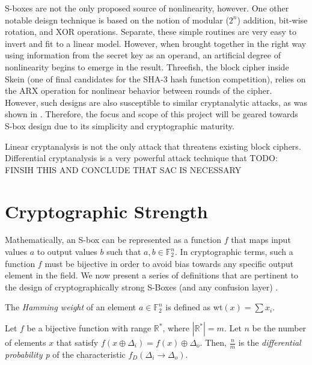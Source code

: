 \documentclass[11pt]{article}
\newcommand{\field}[1]{\mathbb{#1}} %
\begin{document}
S-boxes are not the only proposed source of nonlinearity, however. One other notable deisgn technique is based on the notion of modular ($2^n$) addition, bit-wise rotation, and XOR operations. Separate, these simple routines are very easy to invert and fit to a linear model. However, when brought together in the right way using information from the secret key as an operand, an artificial degree of nonlinearity begins to emerge in the result. Threefish, the block cipher inside Skein (one of final candidates for the SHA-3 hash function competition), relies on the ARX operation for nonlinear behavior between rounds of the cipher. However, such designs are also susceptible to similar cryptanalytic attacks, as was shown in \cite{Khovratovich:2010:RCA:1876089.1876116}. Therefore, the focus and scope of this project will be geared towards S-box design due to its simplicity and cryptographic maturity.

Linear cryptanalysis is not the only attack that threatens existing block ciphers. Differential cryptanalysis is a very powerful attack technique that TODO: FINSIH THIS AND CONCLUDE THAT SAC IS NECESSARY

\section{Cryptographic Strength}
Mathematically, an S-box can be represented as a function $f$ that maps input values $a$ to output values $b$ such that $a,b \in \field{F}_2^n$. In cryptographic terms, such a function $f$ must be bijective in order to avoid bias towards any specific output element in the field. We now present a series of definitions that are pertinent to the design of cryptographically strong S-Boxes (and any confusion layer) \cite{Mar_newanalysis}.


\begin{define}
The \emph{Hamming weight} of an element $a \in \field{F}_2^n$ is defined as wt$(x) = \sum x_i$.
\end{define}

\begin{define}
Let $f$ be a bijective function with range $\mathbb{R^*}$, where $|\mathbb{R^*}| = m$. Let $n$ be the number of elements $x$ that satisfy $f(x \oplus \Delta_i) = f(x) \oplus \Delta_o$. Then, $\frac{n}{m}$ is the \emph{differential probability p} of the characteristic $f_D(\Delta_i \to \Delta_o)$.
\end{define}
\end{document}
